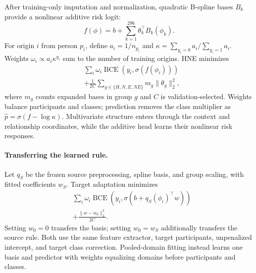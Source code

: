 After training-only imputation and normalization, quadratic B-spline bases $B_k$ provide a nonlinear additive risk logit:
\begin{equation}
f(\phi)=b+\sum_{k=1}^{296}\theta_k^\top B_k(\phi_k).
\end{equation}
For origin $i$ from person $p_i$, define $a_i=1/n_{p_i}$ and $\kappa=\sum_{y_i=0}a_i/\sum_{y_i=1}a_i$. Weights $\omega_i\propto a_i\kappa^{y_i}$ sum to the number of training origins. HNE minimizes
\begin{equation}
\begin{split}
&\sum_i\omega_i\operatorname{BCE}(y_i,\sigma(f(\phi_i)))\\
&+\frac{1}{2C}\sum_{g\in\{H,N,E,NE\}}m_g\|\theta_g\|_2^2,
\end{split}
\end{equation}
where $m_g$ counts expanded bases in group $g$ and $C$ is validation-selected. Weights balance participants and classes; prediction removes the class multiplier as $\hat p=\sigma(f-\log\kappa)$. Multivariate structure enters through the context and relationship coordinates, while the additive head learns their nonlinear risk responses.

\paragraph{Transferring the learned rule.}
Let $q_S$ be the frozen source preprocessing, spline basis, and group scaling, with fitted coefficients $w_S$. Target adaptation minimizes
\begin{equation}
\begin{split}
&\sum_i\omega_i\operatorname{BCE}(y_i,\sigma(b+q_S(\phi_i)^\top w))\\
&+\frac{\|w-w_0\|_2^2}{2C}.
\end{split}
\end{equation}
Setting $w_0=0$ transfers the basis; setting $w_0=w_S$ additionally transfers the source rule. Both use the same feature extractor, target participants, unpenalized intercept, and target class correction. Pooled-domain fitting instead learns one basis and predictor with weights equalizing domains before participants and classes.
